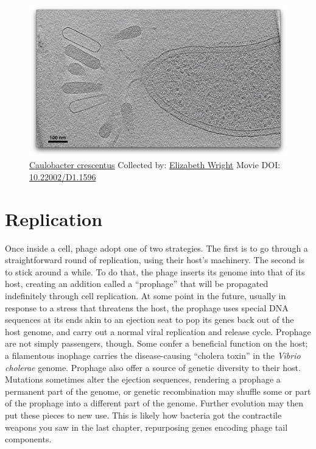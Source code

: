 \documentclass[]{tufte-book}
\begin{document}
\begin{figure}
\includegraphics{movie_stills/10_6a} \caption[\protect\hyperlink{tree}{Caulobacter crescentus} Collected
by: \protect\hyperlink{elizabeth_wright}{Elizabeth Wright} Movie DOI:
\href{https://doi.org/10.22002/D1.1596}{10.22002/D1.1596}]{\protect\hyperlink{tree}{Caulobacter crescentus} Collected
by: \protect\hyperlink{elizabeth_wright}{Elizabeth Wright} Movie DOI:
\href{https://doi.org/10.22002/D1.1596}{10.22002/D1.1596}}\label{fig:10-6a}
\end{figure}

\section{Replication}\label{replication}

Once inside a cell, phage adopt one of two strategies. The first is to
go through a straightforward round of replication, using their host's
machinery. The second is to stick around a while. To do that, the phage
inserts its genome into that of its host, creating an addition called a
``prophage'' that will be propagated indefinitely through cell
replication. At some point in the future, usually in response to a
stress that threatens the host, the prophage uses special DNA sequences
at its ends akin to an ejection seat to pop its genes back out of the
host genome, and carry out a normal viral replication and release cycle.
Prophage are not simply passengers, though. Some confer a beneficial
function on the host; a filamentous inophage carries the disease-causing
``cholera toxin'' in the \emph{Vibrio cholerae} genome. Prophage also
offer a source of genetic diversity to their host. Mutations sometimes
alter the ejection sequences, rendering a prophage a permanent part of
the genome, or genetic recombination may shuffle some or part of the
prophage into a different part of the genome. Further evolution may then
put these pieces to new use. This is likely how bacteria got the
contractile weapons you saw in the last chapter, repurposing genes
encoding phage tail components.
\end{document}
